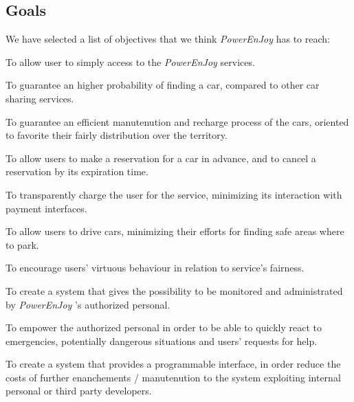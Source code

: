 \documentclass[english]{article}
\newcommand{\powerenjoy}{\textit{PowerEnJoy }}
\newcommand{\powerenjoy}[0]{{PowerEnjoy }}
\begin{document}
	\subsection{Goals}
	We have selected a list of objectives that we think \powerenjoy  has to reach:
	\begin{description}
		

		\item [G.1]{ To allow user to simply access to the \powerenjoy services. }
		\item [G.2]{ To guarantee an higher  probability of finding a car, compared to other car sharing services. }
		\item [G.3]{ To guarantee an efficient manutenution and recharge process of the cars, oriented to favorite their fairly distribution over the territory. }

		\item [G.4]{ To allow users to make a reservation for a car in advance, and to cancel a reservation by its expiration time. }
		\item [G.5]{  To transparently charge the user for the service, minimizing its interaction with payment interfaces. }
		\item [G.6]{  To allow users to drive cars, minimizing their efforts for finding safe areas where to park.}
		\item [G.7]{ To encourage users' virtuous behaviour  in relation to service's fairness. }

		\item [G.8]{ To create a system that gives the possibility to be monitored and administrated by \powerenjoy's authorized personal. }
		\item [G.9]{  To empower the authorized personal in order to be able to quickly react to emergencies, potentially dangerous situations and users' requests for help.}
		\item [G.10]{ To create a system that provides a programmable interface, in order reduce the costs of further enanchements / manutenution to the system exploiting internal personal or third party developers.}
	\end{description}
\end{document}
